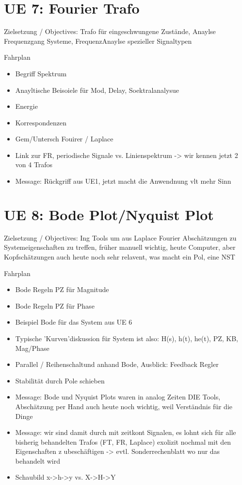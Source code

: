 \newpage
\section{UE 7: Fourier Trafo}
Zielsetzung / Objectives: Trafo für eingeschwungene Zustände, Anaylse Frequenzgang Systeme, FrequenzAnaylse spezieller Signaltypen

Fahrplan
\begin{itemize}
\item Begriff Spektrum
\item Anayltische Beisoiele für Mod, Delay, Soektralanalysue
\item Energie
\item Korrespondenzen
\item Gem/Untersch Fouirer / Laplace
\item Link zur FR, periodische Signale vs. Linienspektrum -> wir kennen jetzt 2 von 4 Trafos
\item Message: Rückgriff aus UE1, jetzt macht die Anwendnung vlt mehr Sinn
\end{itemize}


\newpage
\section{UE 8: Bode Plot/Nyquist Plot}
Zielsetzung / Objectives: Ing Tools um aus Laplace
Fourier Abschätzungen zu Systemeigenschaften zu treffen, früher manuell wichtig, heute
Computer, aber Kopfschätzungen auch heute noch sehr relavent, was macht ein Pol, eine NST

Fahrplan
\begin{itemize}
\item Bode Regeln PZ für Magnitude
\item Bode Regeln PZ für Phase
\item Beispiel Bode für das System aus UE 6
\item Typische 'Kurven'diskussion für System ist also: H(s), h(t), he(t), PZ, KB, Mag/Phase
\item Parallel / Reihenschaltund anhand Bode, Ausblick: Feedback Regler
\item Stabilität durch Pole schieben
\item Message: Bode und Nyquist Plots waren in analog Zeiten DIE Tools, Abschätzung
per Hand auch heute noch wichtig, weil Verständnis für die Dinge
\item Message: wir sind damit durch mit zeitkont Signalen, es lohnt sich für alle bisherig behandelten Trafos (FT, FR, Laplace) exolizit nochmal mit den Eigenschaften z ubeschäftigen -> evtl. Sonderrechenblatt wo nur das behandelt wird
\item Schaubild x->h->y vs. X->H->Y
\end{itemize}


